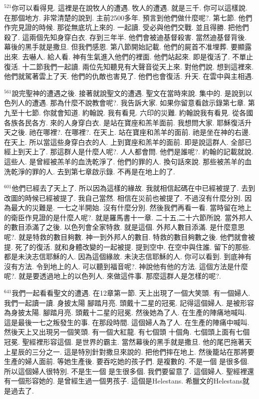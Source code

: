 \documentclass{book}
\begin{document}
$^{521}$你可以看得見.
這裡是在說牧人的遭遇.
牧人的遭遇.
就是三千.
你可以這樣說.
在那個地方.
非常清楚的說到.
主前2500多年.
預言到他們做什麼呢?.
第七節.
他們作完見證的時候.
那從無底坑上來的.
一起讀.
受必與他們交戰.
並且得勝.
把他們殺了.
這兩個先知身穿白衣.
存到三年半.
他們會被迪基督殺害.
當然迪基督背後.
幕後的黑手就是撒旦.
但我們感恩.
第八節開始記載.
他們的屍首不准埋葬.
要顯露出來.
去嚇人.
給人看.
神有生氣進入他們的裡面.
他們站起來.
即是復活了.
不單止復活.
十二節我們一起讀.
兩位先知聽見有大聲音從天上來.
對他們說.
想到這裡來.
他們就駕著雲上了天.
他們的仇敵也害見了.
他們也會復活.
升天.
在雲中與主相遇.

$^{561}$說完聖神的遭遇之後.
接著就說聖文的遭遇.
聖文在當時來說.
集中的.
是說到以色列人的遭遇.
那為什麼不說教會呢?.
我告訴大家.
如果你留意看啟示錄第七章.
第九至十七節.
你就會知道.
約翰說.
我有看見.
六印的災難.
約翰說我有看見.
從各國各族各民各方.
來的人身穿白衣.
是站在寶座和羔羊面前.
我想問大家.
耶穌復活升天之後.
祂在哪裡?.
在哪裡?.
在天上.
站在寶座和羔羊的面前.
祂是坐在神的右邊.
在天上.
所以當這些身穿白衣的人.
上到寶座和羔羊的面前.
即是說這群人.
全部已經上到天上了.
那這群人是什麼人呢?.
人人都會問.
他們是誰呢?.
約翰的記載就說.
這些人.
是曾經被羔羊的血洗乾淨了.
他們的罪的人.
換句話來說.
那些被羔羊的血洗乾淨的罪的人.
去到第七章啟示錄.
不再是在地上的了.

$^{601}$他們已經去了天上了.
所以因為這樣的緣故.
我就相信起碼在中已經被提了.
去到改圖的時候已經被提了.
我自己當然.
相信在災前也被提了.
不過沒有什麼分別.
因為最大的災難是.
一七之半開始.
沒有什麼分別.
然後我們再看一看.
當時留在地上的衛臣作見證的是什麼人呢?.
就是羅馬書十一章.
二十五,二十六節所說.
當外邦人的數目添滿了之後.
以色列會全家特救.
就是這個.
外邦人數目添滿.
是什麼意思呢?.
就是特救的數目夠數.
神一到外邦人的數目.
特救的數目夠數之後.
他們就會被提.
死了的復活.
就和身體改變的一起被提.
提到空中.
在空中與住誰.
留下的那些.
都是未決志信耶穌的人.
因為這個緣故.
未決志信耶穌的人.
你可以看到.
到底神有沒有方法.
令到地上的人.
可以聽到福音呢?.
神說他有他的方法.
這個方法是什麼呢?.
就是要透過地上的以色列人.
來做這件事.
那麼這群人是怎樣的呢?.

$^{641}$我們一起看看聖文的遭遇.
在12章第一節.
天上出現了一個大笑頭.
有一個婦人.
我們一起讀一讀.
身披太陽 腳踏月亮.
頭戴十二星的冠冕.
記得這個婦人.
是被形容為身披太陽.
腳踏月亮.
頭戴十二星的冠冕.
然後她為了人.
在生產的陣痛地喊叫.
這是最後一七之叛發生的事.
在那段時間.
這個婦人為了人.
在生產的陣痛中喊叫.
然後天上又出現另一個笑頭.
有一個大紅龍.
有七個頭 十個角.
七個頭上面有七個冠冕.
聖經裡形容這個.
是世界的霸主.
當然幕後的黑手就是撒旦.
他的尾巴拖著天上星辰的三分之一.
這是特別針對撒旦來說的.
把他們摔在地上.
然後籠站在那將要生產的婦人面前.
等她生產後.
要吞吃她的孩子們.
是複數的.
不是一個 是很多個.
所以這個婦人很特別.
不是生一個 是生很多個.
我們要留意了.
這個婦人.
聖經裡還有一個形容她的.
是曾經生過一個男孩子.
這個是Helestans.
希臘文的Helestans就是過去了.
\end{document}
